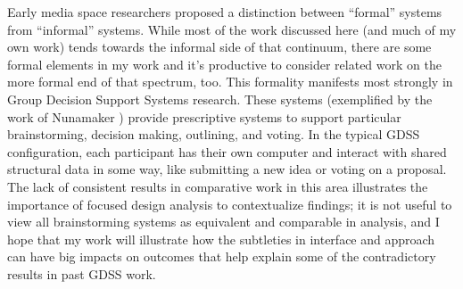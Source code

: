 \documentclass{tufte-handout}
\begin{document}
Early media space researchers proposed a distinction between ``formal'' systems from ``informal'' systems. \citet{olsen_bly_portland} While most of the work discussed here (and much of my own work) tends towards the informal side of that continuum, there are some formal elements in my work and it's productive to consider related work on the more formal end of that spectrum, too. This formality manifests most strongly in Group Decision Support Systems research. These systems (exemplified by the work of Nunamaker \citet{nunamaker_gdss}) provide prescriptive systems to support particular brainstorming, decision making, outlining, and voting. In the typical GDSS configuration, each participant has their own computer and interact with shared structural data in some way, like submitting a new idea or voting on a proposal. The lack of consistent results in comparative work in this area \citet{dennis_results_summary} illustrates the importance of focused design analysis to contextualize findings; it is not useful to view all brainstorming systems as equivalent and comparable in analysis, and I hope that my work will illustrate how the subtleties in interface and approach can have big impacts on outcomes that help explain some of the contradictory results in past GDSS work.












\end{document}
